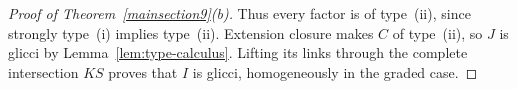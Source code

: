 \documentclass[11pt,letterpaper]{amsart}
\theoremstyle{plain}
\theoremstyle{definition}
\theoremstyle{remark}
\newtheorem{remark}[thm]{Remark}
\begin{document}
\begin{proof}[Proof of Theorem~\ref{mainsection9}(b)]
Thus every factor is of type~(ii), since strongly type~(i) implies type~(ii). Extension closure makes $C$ of type~(ii), so $J$ is glicci by Lemma~\ref{lem:type-calculus}. Lifting its links through the complete intersection $KS$ proves that $I$ is glicci, homogeneously in the graded case.
\end{proof}

\end{document}
